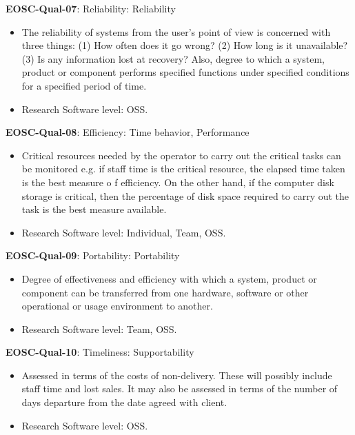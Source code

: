 \textbf{EOSC-Qual-07}: Reliability: Reliability

\begin{itemize}
    \item The reliability of systems from the user's point of view is concerned with three things: (1) How often does it go wrong? (2) How long is it unavailable? (3) Is any information lost at recovery? Also, degree to which a system, product or component performs specified functions under specified conditions for a
specified period of time.~\cite{iso_25010_2011_2017,gillies_modelling_1992,boehm_quantitative_1976}
    \item Research Software level: OSS.
\end{itemize}

\textbf{EOSC-Qual-08}: Efficiency: Time behavior, Performance

\begin{itemize}
    \item Critical resources needed by the operator to carry out the critical tasks can be monitored e.g. if staff time is the critical resource, the elapsed time taken is the best measure o f efficiency. On the other hand, if the computer disk storage is critical, then the percentage of disk space required to carry out the task is the best measure available.~\cite{iso_25010_2011_2017,gillies_modelling_1992,boehm_quantitative_1976}
    \item Research Software level: Individual, Team, OSS.
\end{itemize}

\textbf{EOSC-Qual-09}: Portability: Portability

\begin{itemize}
    \item Degree of effectiveness and efficiency with which a system, product or component can be transferred from one hardware, software or other operational or usage environment to another.~\cite{iso_25010_2011_2017,gillies_modelling_1992,boehm_quantitative_1976,shepherdson_cessda_2019,raymond_software_2013}
    \item Research Software level: Team, OSS.
\end{itemize}

\textbf{EOSC-Qual-10}: Timeliness: Supportability

\begin{itemize}
    \item Assessed in terms of the costs of non-delivery. These will possibly include staff time and lost sales. It may also be assessed in terms of the number of days departure from the date agreed with client.~\cite{gillies_modelling_1992}
    \item Research Software level: OSS.
\end{itemize}

